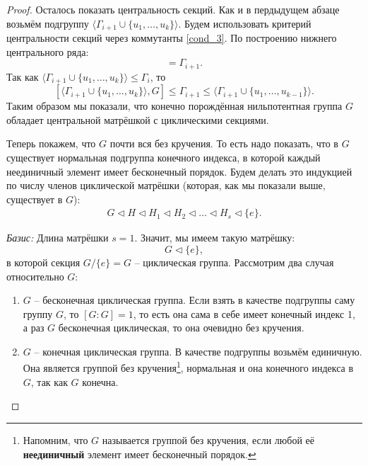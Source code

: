 \documentclass{article}
\begin{document}
\begin{proof}
    Осталось показать центральность секций. Как и в пердыдущем абзаце возьмём подгруппу $\langle \Gamma_{i + 1} \cup \{ u_1, \ldots, u_k \} \rangle$. Будем использовать критерий центральности секций через коммутанты \eqref{cond_3}. По построению нижнего центрального ряда:
    \begin{equation}
        [\Gamma_i, G] = \Gamma_{i + 1}.
    \end{equation}
    Так как $\langle \Gamma_{i + 1} \cup \{ u_1, \ldots, u_k \} \rangle \leqslant \Gamma_i$, то
    \[
        [\langle \Gamma_{i + 1} \cup \{ u_1, \ldots, u_k \} \rangle, G] \leqslant \Gamma_{i + 1} \leqslant \langle \Gamma_{i + 1} \cup \{ u_1, \ldots, u_{k - 1} \} \rangle.
    \]
    Таким образом мы показали, что конечно порождённая нильпотентная группа $G$ обладает центральной матрёшкой с циклическими секциями.

    Теперь покажем, что $G$ почти вся без кручения. То есть надо показать, что в $G$ существует нормальная подгруппа конечного индекса, в которой каждый неединичный элемент имеет бесконечный порядок.
    Будем делать это индукцией по числу членов циклической матрёшки (которая, как мы показали выше, существует в $G$):
    \begin{gather*} \label{skif} \tag{*}
        G \triangleleft H \triangleleft H_1 \triangleleft H_2 \triangleleft \ldots \triangleleft H_s \triangleleft \{ e \}.
    \end{gather*}

    \textit{Базис:} Длина матрёшки $s = 1$. Значит, мы имеем такую матрёшку: $$ G \triangleleft \{ e \}, $$ в которой секция $G / \{ e \} = G$ -- циклическая группа. Рассмотрим два случая относительно $G$:
    \begin{enumerate}
        \item $G$ -- бесконечная циклическая группа. Если взять в качестве подгруппы саму группу $G$, то $[G : G] = 1$, то есть она сама в себе имеет конечный индекс 1, а раз $G$ бесконечная циклическая, то она очевидно без кручения.
        \item $G$ -- конечная циклическая группа. В качестве подгруппы возьмём единичную. Она является группой без кручения\footnote{Напомним, что $G$ называется группой без кручения, если любой её \textbf{неединичный} элемент имеет бесконечный порядок.}, нормальная и она конечного индекса в $G$, так как $G$ конечна.
    \end{enumerate}


\end{proof}
\end{document}
